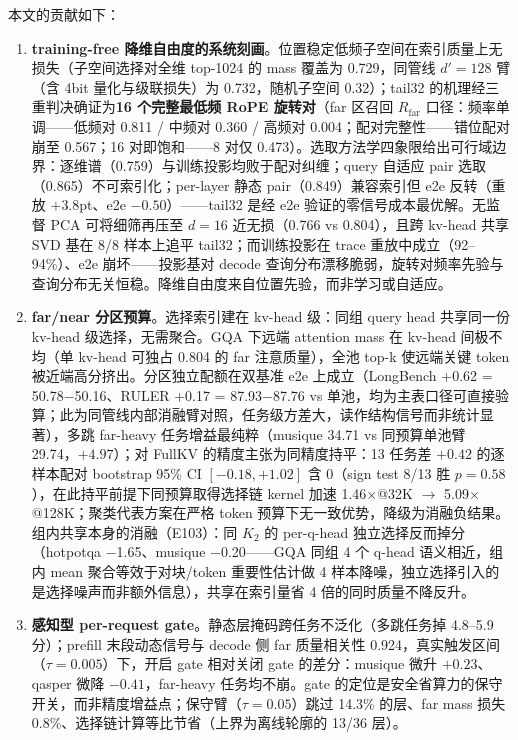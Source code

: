\documentclass[11pt]{article}
\begin{document}
本文的贡献如下：
\begin{enumerate}
\item \textbf{training-free 降维自由度的系统刻画}。位置稳定低频子空间在索引质量上无损失（子空间选择对全维 top-1024 的 mass 覆盖为 0.729，同管线 $d'{=}128$ 臂（含 4bit 量化与级联损失）为 0.732，随机子空间 0.32）；tail32 的机理经三重判决确证为\textbf{16 个完整最低频 RoPE 旋转对}（far 区召回 $R_{\mathrm{far}}$ 口径：频率单调——低频对 0.811 / 中频对 0.360 / 高频对 0.004；配对完整性——错位配对崩至 0.567；16 对即饱和——8 对仅 0.473）。选取方法学四象限给出可行域边界：逐维谱（0.759）与训练投影均败于配对纠缠；query 自适应 pair 选取（0.865）不可索引化；per-layer 静态 pair（0.849）兼容索引但 e2e 反转（重放 $+3.8$pt、e2e $-0.50$）——tail32 是经 e2e 验证的零信号成本最优解。无监督 PCA 可将细筛再压至 $d{=}16$ 近无损（0.766 vs 0.804），且跨 kv-head 共享 SVD 基在 8/8 样本上追平 tail32；而训练投影在 trace 重放中成立（92--94\%）、e2e 崩坏——投影基对 decode 查询分布漂移脆弱，旋转对频率先验与查询分布无关恒稳。降维自由度来自位置先验，而非学习或自适应。
\item \textbf{far/near 分区预算}。选择索引建在 kv-head 级：同组 query head 共享同一份 kv-head 级选择，无需聚合。GQA 下远端 attention mass 在 kv-head 间极不均（单 kv-head 可独占 0.804 的 far 注意质量），全池 top-k 使远端关键 token 被近端高分挤出。分区独立配额在双基准 e2e 上成立（LongBench +0.62 = 50.78$-$50.16、RULER +0.17 = 87.93$-$87.76 vs 单池，均为主表口径可直接验算；此为同管线内部消融臂对照，任务级方差大，读作结构信号而非统计显著），多跳 far-heavy 任务增益最纯粹（musique 34.71 vs 同预算单池臂 29.74，$+4.97$）；对 FullKV 的精度主张为同精度持平：13 任务差 $+0.42$ 的逐样本配对 bootstrap 95\% CI $[-0.18, +1.02]$ 含 0（sign test 8/13 胜 $p{=}0.58$），在此持平前提下同预算取得选择链 kernel 加速 1.46$\times$@32K $\rightarrow$ 5.09$\times$@128K；聚类代表方案在严格 token 预算下无一致优势，降级为消融负结果。组内共享本身的消融（E103）：同 $K_2$ 的 per-q-head 独立选择反而掉分（hotpotqa $-$1.65、musique $-$0.20——GQA 同组 4 个 q-head 语义相近，组内 mean 聚合等效于对块/token 重要性估计做 4 样本降噪，独立选择引入的是选择噪声而非额外信息），共享在索引量省 4 倍的同时质量不降反升。
\item \textbf{感知型 per-request gate}。静态层掩码跨任务不泛化（多跳任务掉 4.8--5.9 分）；prefill 末段动态信号与 decode 侧 far 质量相关性 0.924，真实触发区间（$\tau{=}0.005$）下，开启 gate 相对关闭 gate 的差分：musique 微升 $+0.23$、qasper 微降 $-0.41$，far-heavy 任务均不崩。gate 的定位是安全省算力的保守开关，而非精度增益点；保守臂（$\tau{=}0.05$）跳过 14.3\% 的层、far mass 损失 0.8\%、选择链计算等比节省（上界为离线轮廓的 13/36 层）。

\end{enumerate}
\end{document}
